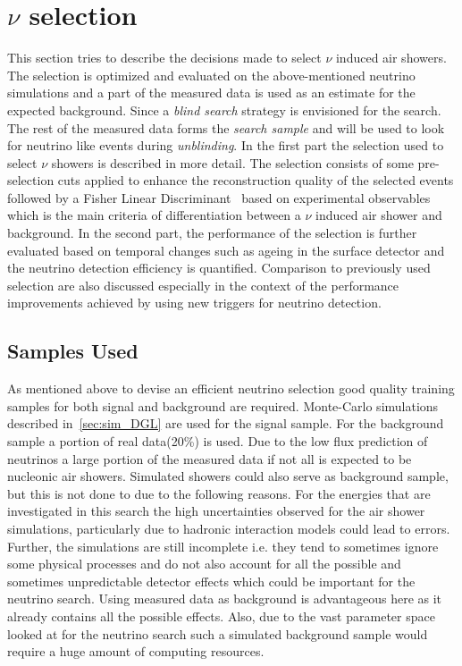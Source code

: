 \section{$\nu$ selection}
\label{sec:nu_sel}
This section tries to describe the decisions made to select $\nu$ induced air showers. The selection is optimized and evaluated on the above-mentioned neutrino simulations and a part of the measured data is used as an estimate for the expected background. Since a \textit{blind search} strategy is envisioned for the search. The rest of the measured data forms the \textit{search sample} and will be used to look for neutrino like events during \textit{unblinding}. 
In the first part the selection used to select $\nu$ showers is described in more detail. The selection consists of some pre-selection cuts applied to enhance the reconstruction quality of the selected events followed by a Fisher Linear Discriminant~\cite{} based on experimental observables which is the main criteria of differentiation between a $\nu$ induced air shower and background.  
In the second part, the performance of the selection is further evaluated based on temporal changes such as ageing in the surface detector and the neutrino detection efficiency is quantified. Comparison to previously used selection are also discussed especially in the context of the performance improvements achieved by using new triggers for neutrino detection.

\subsection{Samples Used}
\label{subsec:nu_sel_samp}

As mentioned above to devise an efficient neutrino selection good quality training samples for both signal and background are required. Monte-Carlo simulations described in~\ref{sec:sim_DGL} are used for the signal sample. For the background sample a portion of real data(20\%) is used. Due to the low flux prediction of neutrinos a large portion of the measured data if not all is expected to be nucleonic air showers. Simulated showers could also serve as background sample, but this is not done to due to the following reasons. For the energies that are investigated in this search the high uncertainties observed for the air shower simulations, particularly due to hadronic interaction models could lead to errors. Further, the simulations are still incomplete i.e. they tend to sometimes ignore some physical processes and do not also account for all the possible and sometimes unpredictable detector effects which could be important for the neutrino search. Using measured data as background is advantageous here as it already contains all the possible effects. Also, due to the vast parameter space looked at for the neutrino search such a simulated background sample would require a huge amount of computing resources. 

